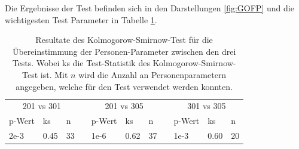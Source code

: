 Die Ergebnisse der Test befinden sich in den Darstellungen \ref{fig:GOFP} und die wichtigesten Test Parameter in Tabelle \ref{tab:GOFP}.
   \begin{table}[htbp]
     \centering
   \begin{tabular}{@{}lllllllllll@{}}
   \toprule
    \multicolumn{3}{c}{201 vs 301} &&  \multicolumn{3}{c}{201 vs 305}&&  \multicolumn{3}{c}{301 vs 305}\\ 
       \cmidrule{1-3}\cmidrule{5-7}\cmidrule{9-11}
    p-Wert & ks & n && p-Wert & ks & n && p-Wert & ks & n \\ 
   \midrule
     2e-3 & 0.45 & 33&& 1e-6 & 0.62 & 37 && 1e-3 & 0.60 & 20  \\ 
   
   \bottomrule
   \end{tabular} 
     \caption{Resultate des Kolmogorow-Smirnow-Test für die Übereinstimmung der Personen-Parameter zwischen den drei Tests. Wobei ks die Test-Statistik des Kolmogorow-Smirnow-Test ist. Mit $n$ wird die Anzahl an Personenparametern angegeben, welche für den Test verwendet werden konnten. }
     \label{tab:GOFP}
   \end{table}
   

